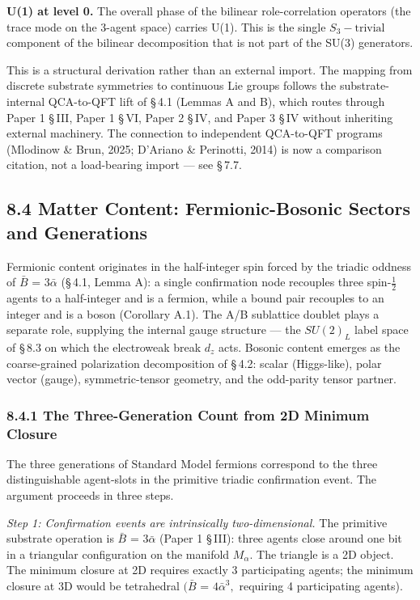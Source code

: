 \documentclass[11pt,oneside]{report}
\theoremstyle{definition}
\theoremstyle{remark}
\begin{document}
\textbf{U(1) at level 0.} The overall phase of the bilinear
role-correlation operators (the trace mode on the 3-agent space) carries
U(1). This is the single \ensuremath{S_{3}-\text{trivial}} component of the bilinear
decomposition that is not part of the SU(3) generators.

This is a structural derivation rather than an external import. The
mapping from discrete substrate symmetries to continuous Lie groups
follows the substrate-internal QCA-to-QFT lift of \S\,4.1 (Lemmas A and B),
which routes through Paper 1 \S\,III, Paper 1 \S\,VI, Paper 2 \S\,IV, and Paper 3
\S\,IV without inheriting external machinery. The connection to independent
QCA-to-QFT programs (Mlodinow \& Brun, 2025; D'Ariano \& Perinotti,
2014) is now a comparison citation, not a load-bearing import --- see
\S\,7.7.

\subsection*{8.4 Matter Content: Fermionic-Bosonic Sectors and Generations}

Fermionic content originates in the half-integer spin forced by the
triadic oddness of \ensuremath{\bar{B}} = \ensuremath{3\bar{\alpha}} (\S\,4.1, Lemma A): a single confirmation
node recouples three spin-\ensuremath{\tfrac{1}{2}} agents to a half-integer and is a fermion,
while a bound pair recouples to an integer and is a boson (Corollary A.1).
The A/B sublattice doublet plays a separate role, supplying the internal
gauge structure --- the \ensuremath{SU(2)_{L}} label space of \S\,8.3 on which the
electroweak break \ensuremath{d_{z}} acts. Bosonic content emerges as the coarse-grained
polarization decomposition of \S\,4.2: scalar (Higgs-like), polar vector
(gauge), symmetric-tensor geometry, and the odd-parity tensor partner.

\subsubsection*{8.4.1 The Three-Generation Count from 2D Minimum Closure}

The three generations of Standard Model fermions correspond to the three
distinguishable agent-slots in the primitive triadic confirmation event.
The argument proceeds in three steps.

\emph{Step 1: Confirmation events are intrinsically two-dimensional.}
The primitive substrate operation is \ensuremath{\bar{B}} = \ensuremath{3\bar{\alpha}} (Paper 1 \S\,III): three agents
close around one bit in a triangular configuration on the manifold \ensuremath{M_{\alpha}.}
The triangle is a 2D object. The minimum closure at 2D requires exactly
3 participating agents; the minimum closure at 3D would be tetrahedral
\ensuremath{(\bar{B}} = \ensuremath{4\bar{\alpha}^{3},} requiring 4 participating agents).
\end{document}
